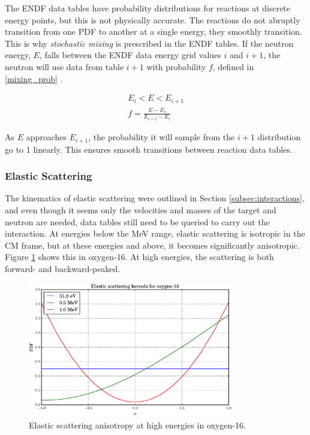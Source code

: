 The ENDF data tables have probability distributions for reactions at discrete energy points, but this is not physically accurate.  The reactions do not abruptly transition from one PDF to another at a single energy, they smoothly transition.  This is why \emph{stochastic mixing} is prescribed in the ENDF tables.  If the neutron energy, $E$, falls between the ENDF data energy grid values $i$ and $i+1$, the neutron will use data from table $i+1$ with probability $f$, defined in \eqref{mixing_prob} \cite{openmc}.

\begin{equation}
\label{mixing_prob}
\begin{gathered}
E_i < E < E_{i+1} \\
f = \frac{E-E_i}{E_{i+1}-E_i}
\end{gathered}
\end{equation}

As $E$ approaches $E_{i+1}$, the probability it will sample from the $i+1$ distribution go to 1 linearly.  This ensures smooth transitions between reaction data tables.


\subsubsection{Elastic Scattering}

The kinematics of elastic scattering were outlined in Section \ref{subsec:interactions}, and even though it seems only the velocities and masses of the target and neutron are needed, data tables still need to be queried to carry out the interaction.  At energies below the MeV range, elastic scattering is isotropic in the CM frame, but at these energies and above, it becomes significantly anisotropic.  Figure \ref{scattering_anisotropy} shows this in oxygen-16.  At high energies, the scattering is both forward- and backward-peaked.  

\begin{figure}[h!] 
  \centering
    \includegraphics[width=0.8\textwidth]{graphics/scattering_anisotropy.eps}
     \caption{Elastic scattering anisotropy at high energies in oxygen-16.  \label{scattering_anisotropy}}
\end{figure}

